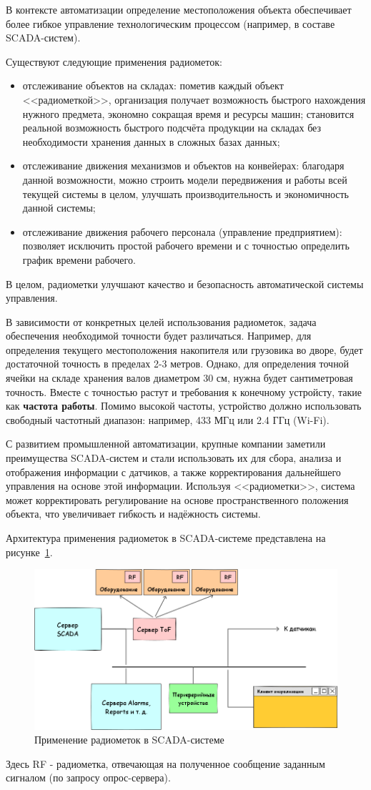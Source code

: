 В контексте автоматизации определение местоположения объекта обеспечивает более гибкое управление технологическим процессом (например, в составе SCADA-систем).

Существуют следующие применения радиометок:

\begin{itemize}
    \item отслеживание объектов на складах: пометив каждый объект <<радиометкой>>, организация получает возможность быстрого нахождения нужного предмета, экономно сокращая время и ресурсы машин; становится реальной возможность быстрого подсчёта продукции на складах без необходимости хранения данных в сложных базах данных;
    \item отслеживание движения механизмов и объектов на конвейерах: благодаря данной возможности, можно строить модели передвижения и работы всей текущей системы в целом, улучшать производительность и экономичность данной системы;
    \item отслеживание движения рабочего персонала (управление предприятием): позволяет исключить простой рабочего времени и с точностью определить график времени рабочего.
\end{itemize}

В целом, радиометки улучшают качество и безопасность автоматической системы управления.

В зависимости от конкретных целей использования радиометок, задача обеспечения необходимой точности будет различаться. Например, для определения текущего местоположения накопителя или грузовика во дворе, будет достаточной точность в пределах 2-3 метров. Однако, для определения точной ячейки на складе хранения валов диаметром 30 см, нужна будет сантиметровая точность. Вместе с точностью растут и требования к конечному устройсту, такие как \textbf{частота работы}. Помимо высокой частоты, устройство должно использовать свободный частотный диапазон: например, 433 МГц или 2.4 ГГц (Wi-Fi).

С развитием промышленной автоматизации, крупные компании заметили преимущества SCADA-систем и стали использовать их для сбора, анализа и отображения информации с датчиков, а также корректирования дальнейшего управления на основе этой информации. Используя <<радиометки>>, система может корректировать регулирование на основе пространственного положения объекта, что увеличивает гибкость и надёжность системы.

Архитектура применения радиометок в SCADA-системе представлена на рисунке~\ref{fig:scada}.

\begin{figure}[ht]
    \includegraphics[width=1\linewidth]{Figures/scada.png}
    \caption{Применение радиометок в SCADA-системе}
    \label{fig:scada}
\end{figure}

Здесь RF - радиометка, отвечающая на полученное сообщение заданным сигналом (по запросу опрос-сервера).
